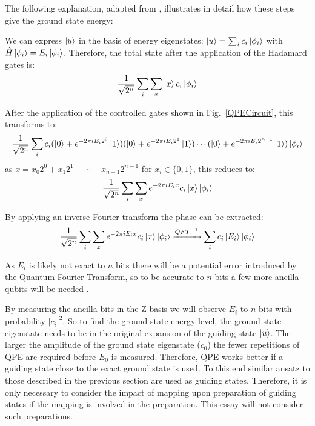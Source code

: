 \documentclass[twoside]{article}
\begin{document}
The following explanation, adapted from \cite{chemistryReview}, illustrates in detail how these steps give the ground state energy:\\
\begin{itemlist}
\item We can express $\ket{u}$ in the basis of energy eigenstates: $\ket{u} = \sum_i c_i \ket{\phi_i}$ with $\hat H \ket{\phi_i} = E_i \ket{\phi_i}$. Therefore, the total state after the application of the Hadamard gates is: 
        \begin{equation}
                \frac{1}{\sqrt{2^n}} \sum_i \sum_x \ket{x} c_i \ket{\phi_i}
        \end{equation}
\item After the application of the controlled gates shown in Fig.~\ref{QPECircuit}, this transforms to:
        \begin{equation}
        \frac{1}{\sqrt{2^n}} \sum_i c_i (\ket{0} + e^{-2\pi i  E_i 2^0}\ket{1})(\ket{0} + e^{-2\pi i E_i 2^1} \ket{1}) \cdots (\ket{0} + e^{-2\pi i  E_i 2^{n-1}}\ket{1}) \ket{\phi_i} \end{equation}
        as $x = x_0 2^0 + x_1 2^1 + \cdots + x_{n-1} 2^{n-1}$ for $x_i \in \{0,1\}$, this reduces to:
        \begin{equation}
                \frac{1}{\sqrt{2^n}} \sum_i \sum_x e^{-2\pi i E_i x}c_i \ket{x}  \ket{\phi_i}
        \end{equation}
\item By applying an inverse Fourier transform the phase can be extracted:
        \begin{equation}
\frac{1}{\sqrt{2^n}} \sum_i \sum_x e^{-2\pi i E_i x}c_i \ket{x}  \ket{\phi_i} \xrightarrow{QFT^{-1}} \sum_i c_i \ket{E_i} \ket{\phi_i}
        \end{equation}
\item As $E_i$ is likely not exact to $n$ bits there will be a potential error introduced by the Quantum Fourier Transform, so to be accurate to $n$ bits a few more ancilla qubits will be needed \cite{nielsenChuang}.
\item By measuring the ancilla bits in the Z basis we will observe $E_i$ to $n$ bits with probability $|c_i|^2$.  So to find the ground state energy level, the ground state eigenstate needs to be in the original expansion of the guiding state $\ket{u}$. The larger the amplitude of the ground state eigenstate ($c_0$) the fewer repetitions of QPE are required before $E_0$ is measured. Therefore, QPE works better if a guiding state close to the exact ground state is used. To this end similar ansatz to those described in the previous section are used as guiding states. Therefore, it is only necessary to consider the impact of mapping upon preparation of guiding states if the mapping is involved in the preparation. This essay will not consider such preparations.\end{itemlist}
\end{document}
